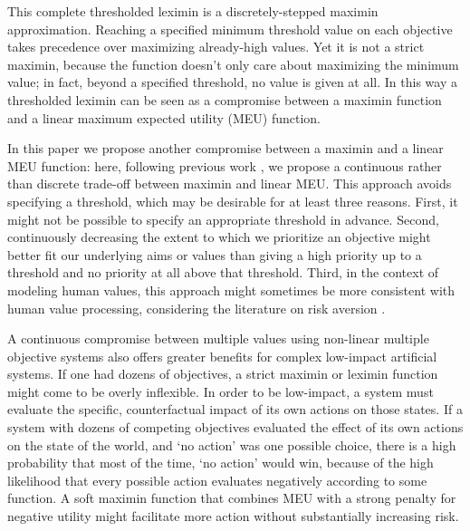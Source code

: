 This complete thresholded leximin is a discretely-stepped maximin approximation. Reaching a specified minimum threshold value on each objective takes precedence over maximizing already-high values. Yet it is not a strict maximin, because the function doesn't only care about maximizing the minimum value; in fact, beyond a specified threshold, no value is given at all. In this way a thresholded leximin can be seen as a compromise between a maximin function and a linear maximum expected utility (MEU) function.

In this paper we propose another compromise between a maximin and a linear MEU function: here, following previous work \cite{rolf_need_2020}, we propose a continuous rather than discrete trade-off between maximin and linear MEU. This approach avoids specifying a threshold, which may be desirable for at least three reasons. First, it might not be possible to specify an appropriate threshold in advance. Second, continuously decreasing the extent to which we prioritize an objective might better fit our underlying aims or values than giving a high priority up to a threshold and no priority at all above that threshold. %
Third, in the context of modeling human values, this approach might sometimes be more consistent with human value processing\cite{Tom515}, considering the literature on risk aversion \cite{pratt1978risk}.


A continuous compromise between multiple values using non-linear multiple objective systems also offers greater benefits for complex low-impact artificial systems. If one had dozens of objectives, a strict maximin or leximin function might come to be overly inflexible. In order to be low-impact, a system must evaluate the specific, counterfactual impact of its own actions on those states. If a system with dozens of competing objectives evaluated the effect of its own actions on the state of the world, and `no action' was one possible choice, there is a high probability that most of the time, `no action' would win, because of the high likelihood that every possible action evaluates negatively according to some function. A soft maximin function that combines MEU with a strong penalty for negative utility might facilitate more action without substantially increasing risk.

